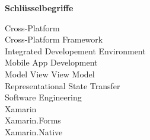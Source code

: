 %
%
% 
% 

\begin{center}
{\Large\bfseries Schlüsselbegriffe}
\end{center}

\noindent
Cross-Platform\\
Cross-Platform Framework\\
Integrated Developement Environment\\
Mobile App Development\\
Model View View Model\\
Representational State Transfer\\
Software Engineering\\
Xamarin\\
Xamarin.Forms\\
Xamarin.Native\\
